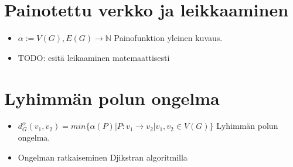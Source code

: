 \begin{itemize}
  \end{itemize}

\section{Painotettu verkko ja leikkaaminen} \label{ch:09_painotettu_verkko_ja_leikkaaminen}

  \begin{itemize}
    \item \(\alpha := V(G), E(G) \rightarrow \mathbb{N}\) Painofunktion yleinen kuvaus.
    \item TODO: esitä leikaaminen matemaattisesti
  \end{itemize}

\section{Lyhimmän polun ongelma} \label{ch:09_lyhimman_polun_ongelma}

  \begin{itemize}
    \item \(d_G^\alpha(v_1, v_2) = min\{\alpha(P) | P:v_1 \rightarrow v_2 | v_1, v_2 \in V(G)\}\) Lyhimmän polun ongelma.
    \item Ongelman ratkaiseminen Djikstran algoritmilla
  \end{itemize}
